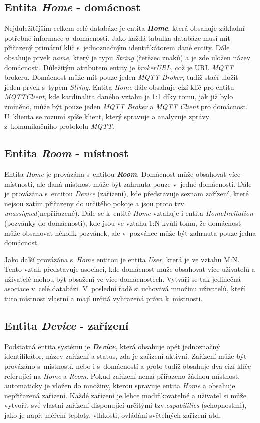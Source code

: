 \subsection*{Entita \emph{Home} - domácnost}
\label{databaze:home}
Nejdůležitějším celkem celé databáze je entita \textbf{\emph{Home}}, která obsahuje základní potřebné informace o~domácnosti.
Jako každá tabulka databáze musí mít přiřazený primární klíč s~jednoznačným identifikátorem dané entity.
Dále obsahuje prvek \emph{name}, který je typu \emph{String} (řetězec znaků) a je zde uložen název domácnosti.
Důležitým atributem entity je \emph{brokerURL}, což je URL \emph{MQTT} brokeru.
Domácnost může mít pouze jeden \emph{MQTT Broker}, tudíž stačí uložit jeden prvek s~typem \emph{String}.
Entita \emph{Home} dále obsahuje cizí klíč pro entitu \emph{MQTTClient}, kde kardinalita daného vztahu je 1:1 díky tomu, jak již bylo zmíněno, může být pouze jeden \emph{MQTT Broker} a \emph{MQTT Client} pro domácnost.
U~klienta se rozumí spíše klient, který spravuje a analyzuje zprávy z~komunikačního protokolu \emph{MQTT}.

\subsection*{Entita \emph{Room} - místnost}
\label{databaze:room}
Entita \emph{Home} je provázána s~entitou \textbf{\emph{Room}}.
Domácnost může obsahovat více místností, ale daná místnost může být zahrnuta pouze v~jedné domácnosti.
Dále je provázána s~entitou \emph{Device} (zařízení), kde představuje seznam zařízení, které nejsou zatím přiřazeny do určitého pokoje a jsou proto tzv. \emph{unassigned}(nepřiřazené).
Dále se k~entitě \emph{Home} vztahuje i entita \emph{HomeInvitation} (pozvánky do domácnosti), kde jsou ve vztahu 1:N kvůli tomu, že domácnost může obsahovat několik pozvánek, ale v~pozvánce může být zahrnuta pouze jedna domácnost.

Jako další provázána s~\emph{Home} entitou je entita \emph{User}, která je ve vztahu M:N.
Tento vztah představuje asociaci, kde domácnost může obsahovat více uživatelů a uživatelé mohou být obsažení ve více domácnostech.
Vytváří se tak jedinečná asociace v~celé databázi.
V~poslední řadě si uchovává množinu uživatelů, kteří tuto místnost vlastní a mají určitá vyhrazená práva k~místnosti.

\subsection*{Entita \emph{Device} - zařízení}
\label{databaze:device}
Podstatná entita systému je \textbf{\emph{Device}}, která obsahuje opět jednoznačný identifikátor, název zařízení a status, zda je zařízení aktivní.
Zařízení může být provázáno s~místností, nebo i s~domácností a proto tudíž obsahuje dva cizí klíče referující na \emph{Home} a \emph{Room}.
Pokud zařízení nemá přiřazeno žádnou místnost, automaticky je vložen do množiny, kterou spravuje entita \emph{Home} a obsahuje nepřiřazená zařízení.
Každé zařízení je lehce modifikovatelné a uživatel si může vytvořit své vlastní zařízení disponující určitými tzv.\emph{capabilities} (schopnostmi), jako je např. měření teploty, vlhkosti, ovládání světelných zařízení atd.

